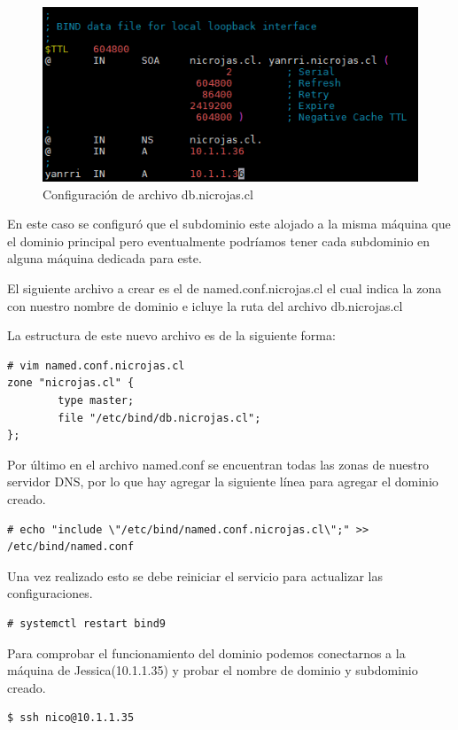 \documentclass[12pt]{article}
\begin{document}
\begin{figure}[!h]
   \centering
   \includegraphics[scale=.65]{imgs/dns_1.PNG}
   \caption{Configuración de archivo db.nicrojas.cl}
   \label{fig9}
\end{figure}

En este caso se configuró que el subdominio este alojado a la misma máquina que el dominio principal pero eventualmente podríamos tener cada subdominio en alguna máquina dedicada para este.

El siguiente archivo a crear es el de named.conf.nicrojas.cl el cual indica la zona con nuestro nombre de dominio e icluye la ruta del archivo db.nicrojas.cl

La estructura de este nuevo archivo es de la siguiente forma:
\begin{lstlisting}[frame=single]
# vim named.conf.nicrojas.cl
zone "nicrojas.cl" {
        type master;
        file "/etc/bind/db.nicrojas.cl";
};
\end{lstlisting}

Por último en el archivo named.conf se encuentran todas las zonas de nuestro servidor DNS, por lo que hay agregar la siguiente línea para agregar el dominio creado.

\begin{lstlisting}[frame=single]
# echo "include \"/etc/bind/named.conf.nicrojas.cl\";" >> /etc/bind/named.conf
\end{lstlisting}

Una vez realizado esto se debe reiniciar el servicio para actualizar las configuraciones.
\begin{lstlisting}[frame=single]
# systemctl restart bind9
\end{lstlisting}

Para comprobar el funcionamiento del dominio podemos conectarnos a la máquina de Jessica(10.1.1.35) y probar el nombre de dominio y subdominio creado.

\begin{lstlisting}[frame=single]
$ ssh nico@10.1.1.35
\end{lstlisting}
\end{document}
